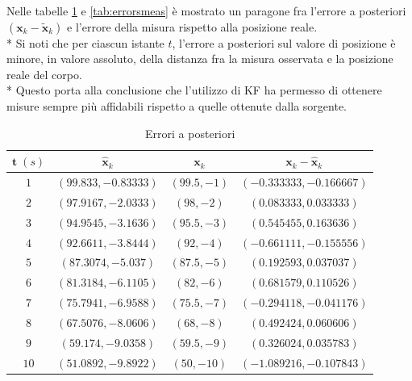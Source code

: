 Nelle tabelle \ref{tab:errors} e \ref{tab:errorsmeas} \`e mostrato un paragone fra l'errore a posteriori $(\mathbf x_k - \mathbf{\tilde{x}}_k)$ e l'errore della misura rispetto alla posizione reale.\\*
Si noti che per ciascun istante $t$, l'errore a posteriori sul valore di posizione \`e minore, in valore assoluto, della distanza fra la misura osservata e la posizione reale del corpo.\\*
Questo porta alla conclusione che l'utilizzo di KF ha permesso di ottenere misure sempre pi\`u affidabili rispetto a quelle ottenute dalla sorgente.
\begin{table}[h]
	\begin{tabular}{|c|c|c|c|}
		\hline 
		$\mathbf{t}\;(s)$ & $\mathbf{\hat{x}}_k$ & $\mathbf x_k$ & $\mathbf x_k - \mathbf{\hat{x}}_k$ \\ 
		\hline 
		$1$&$(99.833,-0.83333)$&$(99.5,-1)$  & $(-0.333333,-0.166667)$
		   \\ 
		\hline 
		$2$&$(97.9167,-2.0333)$ & $(98,-2)$ & $(0.083333,0.033333)$
		
		   \\ 
		\hline 
		$3$& $(94.9545,-3.1636)$ & $(95.5,-3)$ & $(0.545455,0.163636)$
		
		  \\ 
		\hline 
		$4$&  $(92.6611,-3.8444)$ & $(92,-4)$ &$(-0.661111,-0.155556)$
		
		  \\ 
		\hline 
		$5$&$(87.3074,-5.037)$  & $(87.5,-5)$ &  $(0.192593,0.037037)$
		  \\ 
		\hline 
		$6$& $(81.3184,-6.1105)$ & $(82,-6)$ &  $(0.681579,0.110526)$
		  \\ 
		\hline 
		$7$&  $(75.7941,-6.9588)$ & $(75.5,-7)$ &  $(-0.294118,-0.041176)$
		  \\ 
		\hline 
		$8$& $(67.5076,-8.0606)$ & $(68,-8)$ &  $(0.492424,0.060606)$
		  \\ 
		\hline 
		$9$&  $(59.174,-9.0358)$ & $(59.5,-9)$ &  $(0.326024,0.035783)$
		  \\ 
		\hline 
		$10$& $(51.0892,-9.8922)$ & $(50,-10)$ & $(-1.089216,-0.107843)$
		  \\ 
		\hline 
	\end{tabular} 
	\caption{Errori a posteriori}
	\label{tab:errors}
\end{table}
